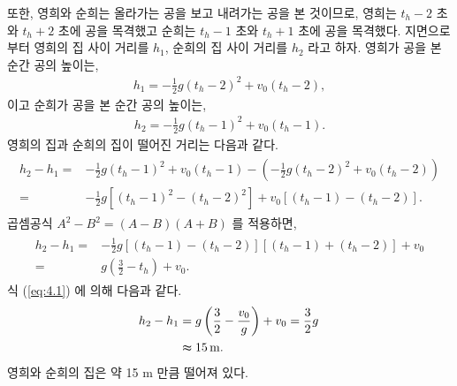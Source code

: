 \documentclass[floatfix,nofootinbib,superscriptaddress,fleqn,preprint]{revtex4}
\begin{document}
또한, 영희와 순희는 올라가는 공을 보고
내려가는 공을 본 것이므로, 영희는 $t_h-2$ 초와
$t_h+2$ 초에 공을 목격했고 순희는 $t_h-1$ 초와 $t_h+1$ 초에 공을 목격했다.
지면으로부터 영희의 집 사이 거리를 $h_1$, 순희의 집 사이 거리를 $h_2$ 라고 하자. 
영희가 공을 본 순간 공의 높이는,
\begin{align}
  h_1 = -\frac{1}{2}g(t_h-2)^2+v_0(t_h-2) ,
\end{align}
이고 순희가 공을 본 순간 공의 높이는,
\begin{align}
  h_2 = -\frac{1}{2}g(t_h-1)^2+v_0(t_h-1).
\end{align}
영희의 집과 순희의 집이 떨어진 거리는 다음과 같다.
\begin{align}
  \begin{split}
    h_2-h_1 =& -\frac{1}{2}g(t_h-1)^2+v_0(t_h-1) 
    -\left( -\frac{1}{2}g(t_h-2)^2+v_0(t_h-2) \right) \\
    =& -\frac{1}{2}g\left[ \left(t_h-1\right)^2
    -\left(t_h-2\right)^2 \right]
    +v_0[ (t_h-1) - (t_h-2) ].
  \end{split}
\end{align}
곱셈공식 $A^2-B^2=(A-B)(A+B)$ 를 적용하면,
\begin{align}
  \begin{split}
    h_2-h_1 =&-\frac{1}{2}g[(t_h-1)-(t_h-2)][(t_h-1)+(t_h-2)]
    +v_0  \\
    =&g\left(\frac{3}{2}-t_h\right)+v_0.
  \end{split}
\end{align}
식 (\ref{eq:4.1}) 에 의해 다음과 같다.
\begin{align}
  \begin{split}
    h_2-h_1 &= g\left(\frac{3}{2}-\frac{v_0}{g}\right)+v_0 
    =\frac{3}{2}g \,  \\
    &\thickapprox 15\,\mathrm{m}.
  \end{split}
\end{align}
영희와 순희의 집은 약 15 m 만큼 떨어져 있다.
\end{document}

